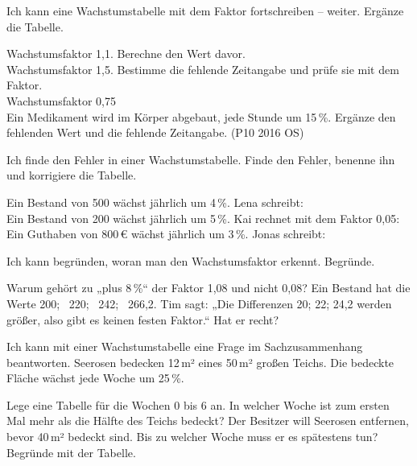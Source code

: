 \begin{aufgabe}{Ich kann eine Wachstumstabelle mit dem Faktor fortschreiben – weiter.}
Ergänze die Tabelle.
\begin{teile}
\teil Wachstumsfaktor 1,1. Berechne den Wert davor. \\ 
\teil Wachstumsfaktor 1,5. Bestimme die fehlende Zeitangabe und prüfe sie mit dem Faktor. \\ 
\teil Wachstumsfaktor 0,75 \\ 
\teil Ein Medikament wird im Körper abgebaut, jede Stunde um 15\,\%. Ergänze den fehlenden Wert und die fehlende Zeitangabe. (P10 2016 OS) \\ 
\end{teile}
\end{aufgabe}

\begin{aufgabe}{Ich finde den Fehler in einer Wachstumstabelle.}
Finde den Fehler, benenne ihn und korrigiere die Tabelle.
\begin{teile}
\teil Ein Bestand von 500 wächst jährlich um 4\,\%. Lena schreibt: \\ 
\teil Ein Bestand von 200 wächst jährlich um 5\,\%. Kai rechnet mit dem Faktor 0,05: \\ 
\teil Ein Guthaben von 800\,€ wächst jährlich um 3\,\%. Jonas schreibt: \\ 
\end{teile}
\end{aufgabe}

\begin{aufgabe}{Ich kann begründen, woran man den Wachstumsfaktor erkennt.}
Begründe.
\begin{teile}
\teil Warum gehört zu „plus 8\,\%“ der Faktor 1,08 und nicht 0,08?
\teil Ein Bestand hat die Werte 200; \ 220; \ 242; \ 266,2. Tim sagt: „Die Differenzen 20; 22; 24,2 werden größer, also gibt es keinen festen Faktor.“ Hat er recht?
\end{teile}
\end{aufgabe}

\begin{aufgabe}{Ich kann mit einer Wachstumstabelle eine Frage im Sachzusammenhang beantworten.}
Seerosen bedecken 12\,m² eines 50\,m² großen Teichs. Die bedeckte Fläche wächst jede Woche um 25\,\%.
\begin{teile}
\teil Lege eine Tabelle für die Wochen 0 bis 6 an.
\teil In welcher Woche ist zum ersten Mal mehr als die Hälfte des Teichs bedeckt?
\teil Der Besitzer will Seerosen entfernen, bevor 40\,m² bedeckt sind. Bis zu welcher Woche muss er es spätestens tun? Begründe mit der Tabelle.
\end{teile}
\end{aufgabe}
